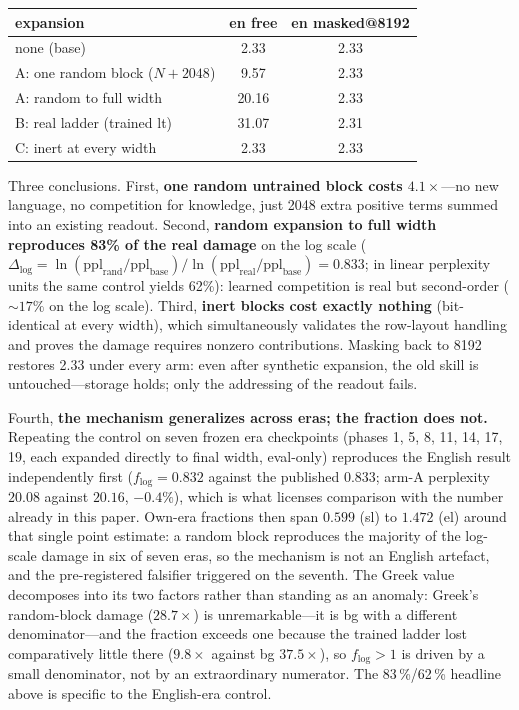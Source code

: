 \documentclass[11pt]{article}
\theoremstyle{definition}\newtheorem{definition}{Definition}
\theoremstyle{remark}\newtheorem{remark}{Remark}
\begin{document}
\begin{center}\small
\begin{tabular}{lcc}
\toprule
expansion & en free & en masked@8192 \\
\midrule
none (base) & 2.33 & 2.33 \\
A: one random block ($N{+}2048$) & 9.57 & 2.33 \\
A: random to full width & 20.16 & 2.33 \\
B: real ladder (trained lt) & 31.07 & 2.31 \\
C: inert at every width & 2.33 & 2.33 \\
\bottomrule
\end{tabular}
\end{center}

Three conclusions. First, \textbf{one random untrained block costs $4.1\times$}---no new
language, no competition for knowledge, just 2048 extra positive terms summed into an
existing readout. Second, \textbf{random expansion to full width reproduces 83\% of the
real damage} on the log scale ($\Delta_{\log} = \ln(\mathrm{ppl}_{\mathrm{rand}}/\mathrm{ppl}_{\mathrm{base}}) / \ln(\mathrm{ppl}_{\mathrm{real}}/\mathrm{ppl}_{\mathrm{base}}) = 0.833$; in linear perplexity units the same control yields 62\%): learned competition is real but second-order ($\sim\!17\%$ on the log scale).
Third, \textbf{inert blocks cost exactly nothing} (bit-identical at every width), which
simultaneously validates the row-layout handling and proves the damage requires nonzero
contributions. Masking back to 8192 restores 2.33 under every arm: even after synthetic
expansion, the old skill is untouched---storage holds; only the addressing of the readout
fails.

Fourth, \textbf{the mechanism generalizes across eras; the fraction does not.} Repeating
the control on seven frozen era checkpoints (phases 1, 5, 8, 11, 14, 17, 19, each expanded
directly to final width, eval-only) reproduces the English result independently first
($f_{\log}=0.832$ against the published $0.833$; arm-A perplexity $20.08$ against
$20.16$, $-0.4\%$), which is what licenses comparison with the number already in this
paper. Own-era fractions then span $0.599$ (sl) to $1.472$ (el) around that single point
estimate: a random block reproduces the majority of the log-scale damage in six of seven
eras, so the mechanism is not an English artefact, and the pre-registered falsifier
triggered on the seventh. The Greek value decomposes into its two factors rather than
standing as an anomaly: Greek's random-block damage ($28.7\times$) is unremarkable---it is
bg with a different denominator---and the fraction exceeds one because the trained ladder
lost comparatively little there ($9.8\times$ against bg $37.5\times$), so $f_{\log}>1$ is
driven by a small denominator, not by an extraordinary numerator. The 83\,\%/62\,\%
headline above is specific to the English-era control.
\end{document}

